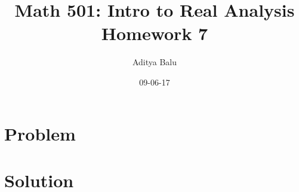 \documentclass[]{article}
\title{Math 501: Intro to Real Analysis\\Homework 7}
\date{09-06-17}
\author{Aditya Balu}
\begin{document}
\maketitle

\section*{Problem}

\section*{Solution}
\end{document}
